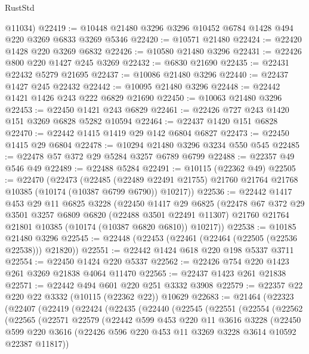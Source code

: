 \begin{lexlean}{RustStd}
\begin{coremodule}
      @11034)
@22419 := @10448 @21480 @3296 @3296 @10452 @6784 @1428 @494 @220 @3269 @6833 @3269 @5346
@22420 := @10571 @21480
@22424 := @22420 @1428 @220 @3269 @6832
@22426 := @10580 @21480 @3296
@22431 := @22426 @800 @220 @1427 @245 @3269
@22432 := @6830 @21690
@22435 := @22431 @22432 @5279 @21695
@22437 := @10086 @21480 @3296
@22440 := @22437 @1427 @245 @22432
@22442 := @10095 @21480 @3296
@22448 := @22442 @1421 @1426 @243 @222 @6829 @21690
@22450 := @10063 @21480 @3296
@22453 := @22450 @1421 @243 @6829
@22461 := @22426 @727 @243 @1420 @151 @3269 @6828 @5282 @10594
@22464 := @22437 @1420 @151 @6828
@22470 := @22442 @1415 @1419 @29 @142 @6804 @6827
@22473 := @22450 @1415 @29 @6804
@22478 := @10294 @21480 @3296 @3234 @550 @545
@22485 := @22478 @57 @372 @29 @5284 @3257 @6789 @6799
@22488 := @22357 @49 @546 @49
@22489 := @22488 @5284
@22491 := @10115 (@22362 @49)
@22505 := @22470
    (@22473
      (@22485
        (@22489 @22491 @21755)
        @21760
        @21764
        @21768
        @10385
        (@10174 (@10387 @6799 @6790))
        @10217))
@22536 := @22442
    @1417
    @453
    @29
    @11
    @6825
    @3228
    (@22450
      @1417
      @29
      @6825
      (@22478
        @67
        @372
        @29
        @3501
        @3257
        @6809
        @6820
        (@22488 @3501 @22491 @11307)
        @21760
        @21764
        @21801
        @10385
        (@10174 (@10387 @6820 @6810))
        @10217))
@22538 := @10185 @21480 @3296
@22545 := @22448 (@22453 (@22461 (@22464 (@22505 (@22536 @22538))) @21820))
@22551 := @22442 @1424 @618 @220 @198 @5337 @3711
@22554 := @22450 @1424 @220 @5337
@22562 := @22426 @754 @220 @1423 @261 @3269 @21838 @4064 @11470
@22565 := @22437 @1423 @261 @21838
@22571 := @22442 @494 @601 @220 @251 @3332 @3908
@22579 := @22357 @22 @220 @22 @3332 (@10115 (@22362 @22)) @10629
@22683 := @21464
    (@22323
      (@22407
        (@22419
          (@22424
            (@22435
              (@22440
                (@22545
                  (@22551
                    (@22554
                      (@22562
                        (@22565
                          (@22571
                            @22579
                            (@22442
                              @599
                              @453
                              @220
                              @11
                              @3616
                              @3228
                              (@22450
                                @599
                                @220
                                @3616
                                (@22426 @596 @220 @453 @11 @3269 @3228 @3614 @10592 @22387 @11817))

\end{coremodule}
\end{lexlean}
